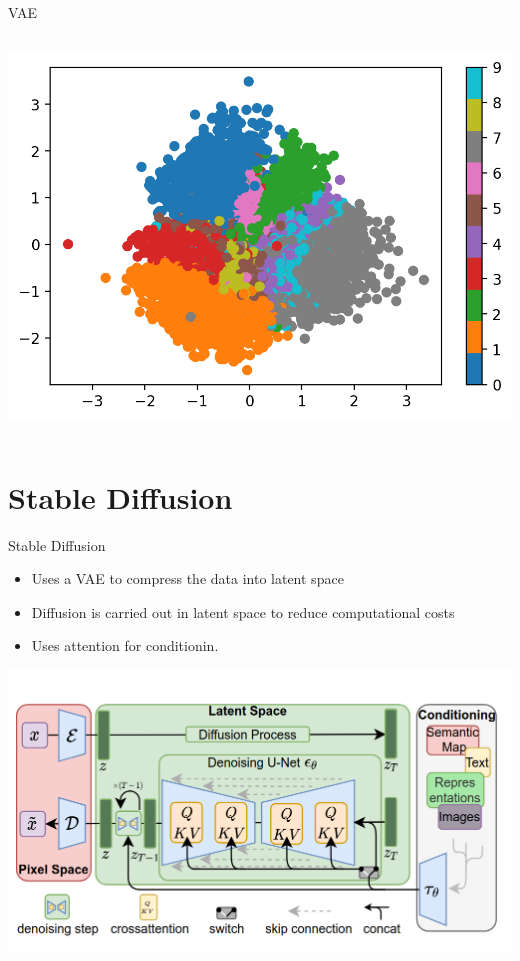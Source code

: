 \documentclass[./main.tex]{subfiles}
\begin{document}
\begin{frame}[label={sec:orgf6035ca}]{VAE}
\begin{columns}
\begin{column}{0.5\columnwidth}
\begin{adjustbox}{width=\textwidth,totalheight=0.6\paperheight,keepaspectratio,center}
\includegraphics[width=\textwidth]{./figs/VAE_Latent_Space.png}
\end{adjustbox}
\end{column}
\end{columns}
\end{frame}

\section{Stable Diffusion}
\label{sec:org865b3b1}
\begin{frame}[label={sec:org795fef4}]{Stable Diffusion}
\begin{itemize}
\item Uses a VAE to compress the data into latent space
\item Diffusion is carried out in latent space to reduce computational costs
\item Uses attention for conditionin.
\end{itemize}
\begin{adjustbox}{width=\textwidth,totalheight=0.6\paperheight,keepaspectratio,center}
\includegraphics[width=\textwidth]{./figs/stable_diffusion.png}
\end{adjustbox}
\end{frame}
\end{document}
